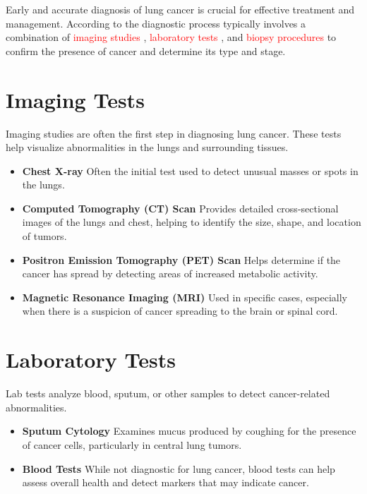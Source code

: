 \begin{remark}
Early and accurate diagnosis of lung cancer is crucial for effective treatment and management. According to \cite{deng2024prospects} the diagnostic process typically involves a combination of \textcolor{red}{imaging studies} , \textcolor{red}{laboratory tests} , and \textcolor{red}{biopsy procedures} to confirm the presence of cancer and determine its type and stage.
\end{remark}

\section{Imaging Tests} 
Imaging studies are often the first step in diagnosing lung cancer. These tests help visualize abnormalities in the lungs and surrounding tissues.

\begin{highlight}
\begin{itemize}
    \item \textbf{Chest X-ray} Often the initial test used to detect unusual masses or spots in the lungs\cite{kalkeseetharaman2024bird}.
    \item \textbf{Computed Tomography (CT) Scan} Provides detailed cross-sectional images of the lungs and chest, helping to identify the size, shape, and location of tumors\cite{hendrick2024benefit}.
    \item \textbf{Positron Emission Tomography (PET) Scan} Helps determine if the cancer has spread by detecting areas of increased metabolic activity.
    \item \textbf{Magnetic Resonance Imaging (MRI)} Used in specific cases, especially when there is a suspicion of cancer spreading to the brain or spinal cord\cite{li2024application}.
\end{itemize}
\end{highlight}

\section{Laboratory Tests}
Lab tests analyze blood, sputum, or other samples to detect cancer-related abnormalities.

\begin{highlight}
\begin{itemize}
    \item \textbf{Sputum Cytology} \cite{wen2024methylated}Examines mucus produced by coughing for the presence of cancer cells, particularly in central lung tumors.
    \item \textbf{Blood Tests} While not diagnostic for lung cancer, blood tests can help assess overall health and detect markers that may indicate cancer.
\end{itemize}
\end{highlight}

